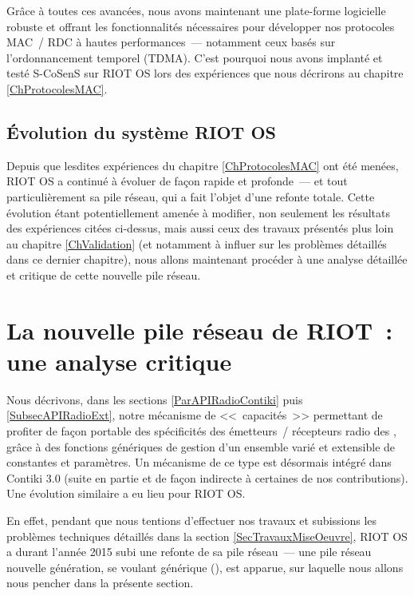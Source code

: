 \bigskip

Grâce à toutes ces avancées, nous avons maintenant une plate-forme
logicielle robuste et offrant les fonctionnalités nécessaires pour
développer nos protocoles MAC~/ RDC à hautes performances~--- notamment
ceux basés sur l'ordonnancement temporel (TDMA).
C'est pourquoi nous avons implanté et testé S-CoSenS sur RIOT OS lors des
expériences que nous décrirons au chapitre \vref{ChProtocolesMAC}.


\subsection{\'Evolution du système RIOT OS}
\label{SubSecEvoRIOT}

Depuis que lesdites expériences du chapitre \ref{ChProtocolesMAC} ont
été menées, RIOT OS a continué à évoluer de façon rapide et profonde~---
et tout particulièrement sa pile réseau, qui a fait l'objet d'une refonte
totale. Cette évolution étant potentiellement amenée à modifier, non
seulement les résultats des expériences citées ci-dessus, mais aussi
ceux des travaux présentés plus loin au chapitre \vref{ChValidation}
(et notamment à influer sur les problèmes détaillés dans ce dernier
chapitre), nous allons maintenant procéder à une analyse détaillée
et critique de cette nouvelle pile réseau.


\section{La nouvelle pile réseau de RIOT~: une analyse critique}
\label{SecGnrcRIOT}

Nous décrivons, dans les sections \vref{ParAPIRadioContiki} puis
\vref{SubsecAPIRadioExt}, notre mécanisme de <<~capacités~>> permettant
de profiter de façon portable des spécificités des émetteurs~/ récepteurs
radio des , grâce à des fonctions génériques de gestion
d'un ensemble varié et extensible de constantes et paramètres.
Un mécanisme de ce type est désormais intégré dans Contiki 3.0
\cite{Contiki3Annonce} (suite en partie et de façon indirecte à certaines
de nos contributions). Une évolution similaire a eu lieu pour RIOT OS.

En effet, pendant que nous tentions d'effectuer nos travaux
et subissions les problèmes techniques détaillés dans la section
\vref{SecTravauxMiseOeuvre}, RIOT OS a durant l'année 2015 subi une
refonte de sa pile réseau~--- une pile réseau nouvelle génération,
se voulant générique (), est apparue, sur laquelle
nous allons nous pencher dans la présente section.

